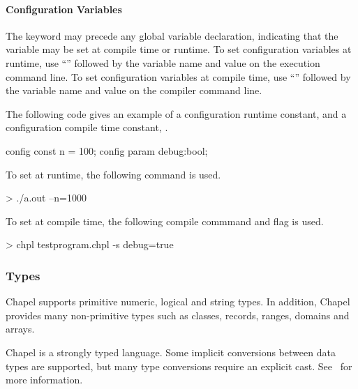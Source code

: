 \paragraph{Configuration Variables}
The keyword  may precede any global variable
declaration, indicating that the variable may be set at
compile time or runtime.
To set configuration variables at runtime, use ``\chpl{--}''
followed by the variable name and value on the execution
command line.
To set configuration variables at compile time, use
``'' followed by the variable name and value on the
compiler command line.

\begin{example}
The following code gives an example of a configuration
runtime constant,  and a configuration compile time constant,
.
\begin{chapel}
config const n = 100;
config param debug:bool;
\end{chapel}

To set  at runtime, the following command is used.
\begin{commandline}
> ./a.out --n=1000
\end{commandline}

To set  at compile time, the following compile commmand
and flag is used.
\begin{commandline}
> chpl testprogram.chpl -s debug=true
\end{commandline}
\end{example}

\subsubsection{Types}
Chapel supports primitive numeric, logical and string types.  In
addition, Chapel provides many non-primitive types such as classes,
records, ranges, domains and arrays.  

Chapel is a strongly typed language.  Some implicit conversions 
between data types are supported, but many type conversions require
an explicit cast.  See~ for more information. 

